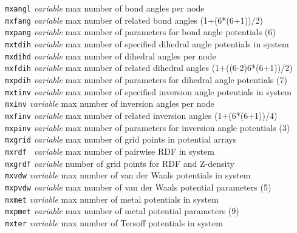 \begin{tabbing}
\> {\tt mxangl}      \> {\em variable}     \> max number of bond angles per node \\
\> {\tt mxfang}      \> {\em variable}     \> max number of related bond angles (1+(6*(6+1))/2) \\
\> {\tt mxpang}      \> {\em variable}     \> max number of parameters for bond angle potentials (6) \\
\> {\tt mxtdih}      \> {\em variable}     \> max number of specified dihedral angle potentials in system \\
\> {\tt mxdihd}      \> {\em variable}     \> max number of dihedral angles per node \\
\> {\tt mxfdih}      \> {\em variable}     \> max number of related dihedral angles (1+((6-2)6*(6+1))/2) \\
\> {\tt mxpdih}      \> {\em variable}     \> max number of parameters for dihedral angle potentials (7) \\
\> {\tt mxtinv}      \> {\em variable}     \> max number of specified inversion angle potentials in system \\
\> {\tt mxinv}       \> {\em variable}     \> max number of inversion angles per node \\
\> {\tt mxfinv}      \> {\em variable}     \> max number of related inversion angles (1+(6*(6+1))/4) \\
\> {\tt mxpinv}      \> {\em variable}     \> max number of parameters for inversion angle potentials (3) \\
\> {\tt mxgrid}      \> {\em variable}     \> max number of grid points in potential arrays \\
\> {\tt mxrdf }      \> {\em variable}     \> max number of pairwise RDF in system \\
\> {\tt mxgrdf}      \> {\em variable}     \> number of grid points for RDF and Z-density \\
\> {\tt mxvdw}       \> {\em variable}     \> max number of van der Waals potentials in system \\
\> {\tt mxpvdw}      \> {\em variable}     \> max number of van der Waals potential parameters (5) \\
\> {\tt mxmet}       \> {\em variable}     \> max number of metal potentials in system \\
\> {\tt mxpmet}      \> {\em variable}     \> max number of metal potential parameters (9) \\
\> {\tt mxter}       \> {\em variable}     \> max number of Tersoff potentials in system \\

\end{tabbing}
